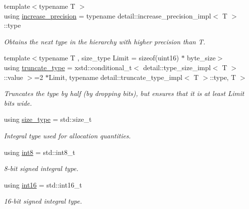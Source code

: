 \begin{DoxyCompactItemize}
{\footnotesize template$<$typename T $>$ }\\using \hyperlink{namespacegko_a373c2b4782d95e675d7e91a75bab101d}{increase\+\_\+precision} = typename detail\+::increase\+\_\+precision\+\_\+impl$<$ T $>$\+::type
\begin{DoxyCompactList}\small\item\em Obtains the next type in the hierarchy with higher precision than T. \end{DoxyCompactList}\item 
\mbox{\label{namespacegko_abf540a6830b3ac4cd6b193133510f4d7}} 
{\footnotesize template$<$typename T , size\+\_\+type Limit = sizeof(uint16) $\ast$ byte\+\_\+size$>$ }\\using \hyperlink{namespacegko_abf540a6830b3ac4cd6b193133510f4d7}{truncate\+\_\+type} = xstd\+::conditional\+\_\+t$<$ detail\+::type\+\_\+size\+\_\+impl$<$ T $>$\+::value $>$=2 $\ast$Limit, typename detail\+::truncate\+\_\+type\+\_\+impl$<$ T $>$\+::type, T $>$
\begin{DoxyCompactList}\small\item\em Truncates the type by half (by dropping bits), but ensures that it is at least {\ttfamily Limit} bits wide. \end{DoxyCompactList}\item 
\mbox{\label{namespacegko_a6e5c95df0ae4e47aab2f604a22d98ee7}} 
using \hyperlink{namespacegko_a6e5c95df0ae4e47aab2f604a22d98ee7}{size\+\_\+type} = std\+::size\+\_\+t
\begin{DoxyCompactList}\small\item\em Integral type used for allocation quantities. \end{DoxyCompactList}\item 
\mbox{\label{namespacegko_ad7a8c26c7cb547663bff3cc1df3c8db0}} 
using \hyperlink{namespacegko_ad7a8c26c7cb547663bff3cc1df3c8db0}{int8} = std\+::int8\+\_\+t
\begin{DoxyCompactList}\small\item\em 8-\/bit signed integral type. \end{DoxyCompactList}\item 
\mbox{\label{namespacegko_a26d2e6df1a5280b092afd1e5d9fabeed}} 
using \hyperlink{namespacegko_a26d2e6df1a5280b092afd1e5d9fabeed}{int16} = std\+::int16\+\_\+t
\begin{DoxyCompactList}\small\item\em 16-\/bit signed integral type. \end{DoxyCompactList}\item 

\end{DoxyCompactItemize}
